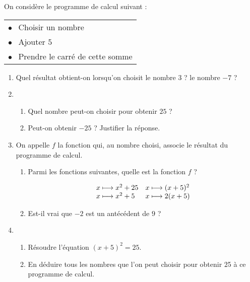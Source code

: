 
\medskip
 
On considère le programme de calcul suivant : 

\begin{center}
\begin{tabular}{|l|}\hline
$\bullet~~$ Choisir un nombre\\
$\bullet~~$ Ajouter $5$\\
$\bullet~~$ Prendre le carré de cette somme\\ \hline
\end{tabular}
\end{center}

\begin{enumerate}
\item Quel résultat obtient-on lorsqu'on choisit le nombre $3$ ? le nombre $- 7$ ? 
\item 
	\begin{enumerate}
		\item Quel nombre peut-on choisir pour obtenir $25$ ? 
		\item Peut-on obtenir $- 25$ ? Justifier la réponse.
	\end{enumerate} 
\item On appelle $f$ la fonction qui, au nombre choisi, associe le résultat du programme de calcul. 
	\begin{enumerate}
		\item Parmi les fonctions suivantes, quelle est la fonction $f$ ? 

\[\begin{array}{l l}
	x \longmapsto x^2 + 25 &	x \longmapsto (x + 5)^2\\ 
	x \longmapsto x^2 + 5& 	x \longmapsto 2(x + 5)
	\end{array}\]
	 
		\item Est-il vrai que $- 2$ est un antécédent de $9$ ? 
	\end{enumerate}		
\item
	\begin{enumerate}
		\item Résoudre l'équation $(x + 5)^2 = 25$. 
		\item En déduire tous les nombres que l'on peut choisir pour obtenir $2$5 à ce programme de calcul. 
	\end{enumerate}
\end{enumerate}

\bigskip

